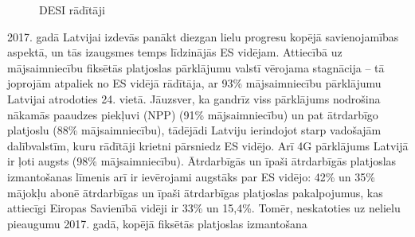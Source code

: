 \begin{figure}[ht]
    \label{att:desi_savienojamiba}
    \caption{DESI rādītāji}
\end{figure}
\par
2017. gadā Latvijai izdevās panākt diezgan lielu progresu kopējā savienojamības
aspektā, un tās izaugsmes temps līdzinājās ES vidējam. Attiecībā uz mājsaimniecību
fiksētās platjoslas pārklājumu valstī vērojama stagnācija – tā joprojām atpaliek no ES
vidējā rādītāja, ar 93\% mājsaimniecību pārklājumu Latvijai atrodoties 24. vietā.
Jāuzsver, ka gandrīz viss pārklājums nodrošina nākamās paaudzes piekļuvi (NPP)
(91\% mājsaimniecību) un pat ātrdarbīgo platjoslu (88\% mājsaimniecību), tādējādi
Latviju ierindojot starp vadošajām dalībvalstīm, kuru rādītāji krietni pārsniedz ES
vidējo. Arī 4G pārklājums Latvijā ir ļoti augsts (98\% mājsaimniecību). Ātrdarbīgās un
īpaši ātrdarbīgās platjoslas izmantošanas līmenis arī ir ievērojami augstāks par ES
vidējo: 42\% un 35\% mājokļu abonē ātrdarbīgas un īpaši ātrdarbīgas platjoslas
pakalpojumus, kas attiecīgi Eiropas Savienībā vidēji ir 33\% un 15,4\%. Tomēr,
neskatoties uz nelielu pieaugumu 2017. gadā, kopējā fiksētās platjoslas izmantošana
